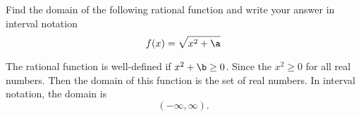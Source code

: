





Find the domain of the following rational function and write your answer in interval notation
\[
  f(x)=\sqrt{x^2+\a}
\]

\begin{solution}
The rational function is well-defined if $x^2+\b\geq 0$. Since the $x^2\geq 0$ for all real numbers. Then the domain of this function is the set of real numbers.  In interval notation, the domain is 
\[(-\infty, \infty).\]
\end{solution}